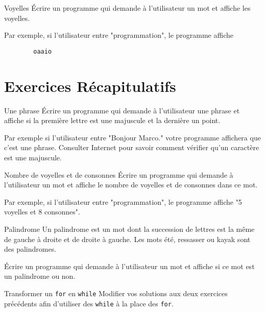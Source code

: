 \documentclass[a4paper,11pt]{style-esi/td}
\begin{document}
	\begin{Exercice}{Voyelles}	
		\'Ecrire un programme qui demande à l'utilisateur 
		un mot et affiche les voyelles.
		
		Par exemple, si l'utilisateur entre "programmation", le programme affiche
		
		\begin{verbatim}
		oaaio
		\end{verbatim}
	\end{Exercice}

\section{Exercices Récapitulatifs}

	\begin{Exercice}{Une phrase}	
		\'Ecrire un programme qui demande à l'utilisateur 
		une phrase et affiche si la première lettre est une majuscule et la dernière un point.
		
		Par exemple si l'utilisateur entre "Bonjour Marco." votre programme affichera que c'est une phrase.
		Consulter Internet pour savoir comment vérifier qu'un caractère est une majuscule. 
		
	\end{Exercice}

	\begin{Exercice}{Nombre de voyelles et de consonnes}	
		\'Ecrire un programme qui demande à l'utilisateur 
		un mot et affiche le nombre de voyelles et de consonnes dans ce mot.
		
		Par exemple, si l'utilisateur entre "programmation", le programme affiche "5 voyelles et 8 consonnes".	
	\end{Exercice}


	\begin{Exercice}{Palindrome}
		Un palindrome est un mot dont la succession de lettres est la même 
		de gauche à droite et de droite à gauche. 
		Les mots été, ressasser ou kayak sont des palindromes.
		  	
		\'Ecrire un programme qui demande à l'utilisateur 
		un mot et affiche si ce mot est un palindrome ou non.
	\end{Exercice}

	\begin{Exercice}{Transformer un \texttt{for} en \texttt{while}}
		Modifier vos solutions aux deux exercices précédents afin d'utiliser des \texttt{while} à la place des \texttt{for}. 
	\end{Exercice}
\end{document}
